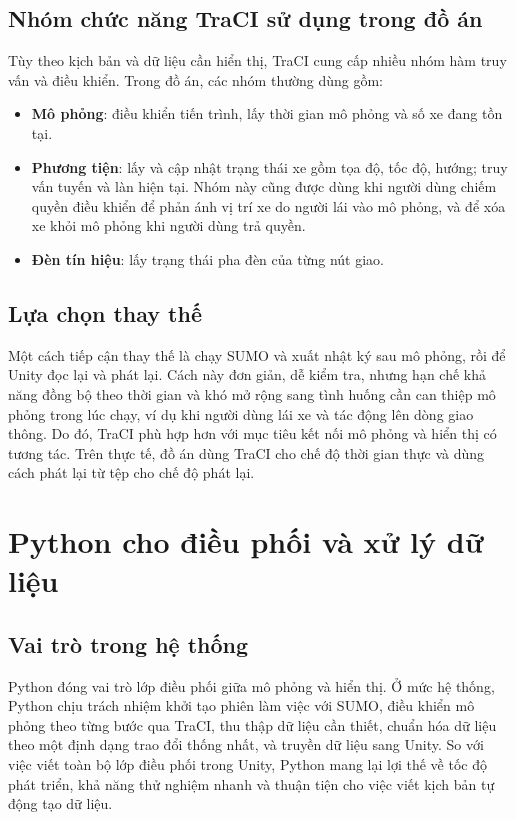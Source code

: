 ﻿\documentclass[../DoAn.tex]{subfiles}
\begin{document}
\subsection{Nhóm chức năng TraCI sử dụng trong đồ án}

Tùy theo kịch bản và dữ liệu cần hiển thị, \gls{TraCI} cung cấp nhiều nhóm hàm
truy vấn và điều khiển. Trong đồ án, các nhóm thường dùng gồm:

\begin{itemize}[leftmargin=2em]
	\item \textbf{Mô phỏng}: điều khiển tiến trình, lấy thời gian mô phỏng và số
	xe đang tồn tại.
	\item \textbf{Phương tiện}: lấy và cập nhật trạng thái xe gồm tọa độ, tốc độ,
	hướng; truy vấn tuyến và làn hiện tại. Nhóm này cũng được dùng khi người dùng
	chiếm quyền điều khiển để phản ánh vị trí xe do người lái vào mô phỏng, và để
	xóa xe khỏi mô phỏng khi người dùng trả quyền.
	\item \textbf{Đèn tín hiệu}: lấy trạng thái pha đèn của từng nút giao.
\end{itemize}

\subsection{Lựa chọn thay thế}

Một cách tiếp cận thay thế là chạy \gls{SUMO} và xuất nhật ký sau mô phỏng, rồi
để Unity đọc lại và phát lại. Cách này đơn giản, dễ kiểm tra, nhưng hạn chế khả
năng đồng bộ theo thời gian và khó mở rộng sang tình huống cần can thiệp mô phỏng
trong lúc chạy, ví dụ khi người dùng lái xe và tác động lên dòng giao thông. Do
đó, \gls{TraCI} phù hợp hơn với mục tiêu kết nối mô phỏng và hiển thị có tương
tác. Trên thực tế, đồ án dùng \gls{TraCI} cho chế độ thời gian thực và dùng cách
phát lại từ tệp cho chế độ phát lại.

\section{Python cho điều phối và xử lý dữ liệu}

\subsection{Vai trò trong hệ thống}

Python đóng vai trò lớp điều phối giữa mô phỏng và hiển thị. Ở mức hệ thống,
Python chịu trách nhiệm khởi tạo phiên làm việc với \gls{SUMO}, điều khiển mô
phỏng theo từng bước qua \gls{TraCI}, thu thập dữ liệu cần thiết, chuẩn hóa dữ
liệu theo một định dạng trao đổi thống nhất, và truyền dữ liệu sang Unity. So với
việc viết toàn bộ lớp điều phối trong Unity, Python mang lại lợi thế về tốc độ
phát triển, khả năng thử nghiệm nhanh và thuận tiện cho việc viết kịch bản tự
động tạo dữ liệu.
\end{document}

